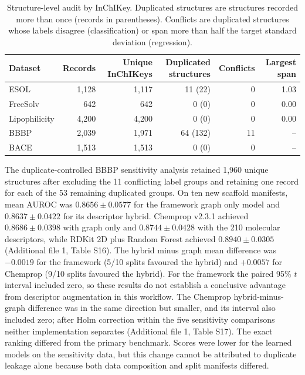 \begin{table}[t]
\caption{Structure-level audit by InChIKey. Duplicated structures are structures recorded more than once (records in parentheses). Conflicts are duplicated structures whose labels disagree (classification) or span more than half the target standard deviation (regression).}
\label{tab:hygiene}
\centering
\footnotesize
\begin{tabular}{@{}lrrrrr@{}}
\toprule
Dataset & Records & Unique InChIKeys & Duplicated structures & Conflicts & Largest span \\
\midrule
ESOL & 1,128 & 1,117 & 11 (22) & 0 & 1.03 \\
FreeSolv & 642 & 642 & 0 (0) & 0 & 0.00 \\
Lipophilicity & 4,200 & 4,200 & 0 (0) & 0 & 0.00 \\
BBBP & 2,039 & 1,971 & 64 (132) & 11 & -- \\
BACE & 1,513 & 1,513 & 0 (0) & 0 & -- \\
\bottomrule
\end{tabular}
\end{table}

The duplicate-controlled BBBP sensitivity analysis retained 1,960 unique structures after excluding the 11 conflicting label groups and retaining one record for each of the 53 remaining duplicated groups. On ten new scaffold manifests, mean AUROC was $0.8656\pm0.0577$ for the framework graph only model and $0.8637\pm0.0422$ for its descriptor hybrid. Chemprop v2.3.1 achieved $0.8686\pm0.0398$ with graph only and $0.8744\pm0.0428$ with the 210 molecular descriptors, while RDKit 2D plus Random Forest achieved $0.8940\pm0.0305$ (Additional file 1, Table S16). The hybrid minus graph mean difference was $-0.0019$ for the framework (5/10 splits favoured the hybrid) and $+0.0057$ for Chemprop (9/10 splits favoured the hybrid). For the framework the paired 95\% $t$ interval included zero, so these results do not establish a conclusive advantage from descriptor augmentation in this workflow. The Chemprop hybrid-minus-graph difference was in the same direction but smaller, and its interval also included zero; after Holm correction within the five sensitivity comparisons neither implementation separates (Additional file 1, Table S17). The exact ranking differed from the primary benchmark. Scores were lower for the learned models on the sensitivity data, but this change cannot be attributed to duplicate leakage alone because both data composition and split manifests differed.

